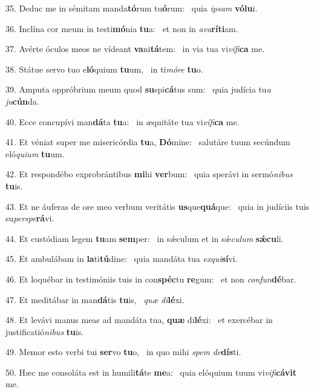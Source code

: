35. Deduc me in sémitam manda\textbf{tó}rum tu\textbf{ó}rum: \ast\  quia \textit{ip}\textit{sam} \textbf{vó}\textbf{lu}i.\

36. Inclína cor meum in testi\textbf{mó}nia \textbf{tu}a: \ast\  et non in \textit{a}\textit{va}\textbf{rí}\textbf{ti}am.\

37. Avérte óculos meos ne vídeant \textbf{va}ni\textbf{tá}tem: \ast\  in via tua vi\textit{ví}\textit{fi}\textbf{ca} me.\

38. Státue servo tuo e\textbf{ló}quium \textbf{tu}um, \ast\  in ti\textit{mó}\textit{re} \textbf{tu}o.\

39. Amputa oppróbrium meum quod \textbf{su}spi\textbf{cá}tus sum: \ast\  quia judícia tu\textit{a} \textit{ju}\textbf{cún}da.\

40. Ecce concupívi man\textbf{dá}ta \textbf{tu}a: \ast\  in æquitáte tua vi\textit{ví}\textit{fi}\textbf{ca} me.\

41. Et véniat super me misericórdia \textbf{tu}a, \textbf{Dó}mine: \ast\  salutáre tuum secúndum eló\textit{qui}\textit{um} \textbf{tu}um.\

42. Et respondébo exprobrántibus \textbf{mi}hi \textbf{ver}bum: \ast\  quia sperávi in sermó\textit{ni}\textit{bus} \textbf{tu}is.\

43. Et ne áuferas de ore meo verbum veritátis \textbf{us}que\textbf{quá}que: \ast\  quia in judíciis tuis su\textit{per}\textit{spe}\textbf{rá}vi.\

44. Et custódiam legem \textbf{tu}am \textbf{sem}per: \ast\  in sǽculum et in sǽ\textit{cu}\textit{lum} \textbf{sǽ}\textbf{cu}li.\

45. Et ambulábam in \textbf{la}ti\textbf{tú}dine: \ast\  quia mandáta tua \textit{ex}\textit{qui}\textbf{sí}vi.\

46. Et loquébar in testimóniis tuis in con\textbf{spéc}tu \textbf{re}gum: \ast\  et non \textit{con}\textit{fun}\textbf{dé}bar.\

47. Et meditábar in man\textbf{dá}tis \textbf{tu}is, \ast\  \textit{quæ} \textit{di}\textbf{lé}xi.\

48. Et levávi manus meas ad mandáta tua, \textbf{quæ} di\textbf{lé}xi: \ast\  et exercébar in justificatió\textit{ni}\textit{bus} \textbf{tu}is.\

49. Memor esto verbi tui \textbf{ser}vo \textbf{tu}o, \ast\  in quo mihi \textit{spem} \textit{de}\textbf{dís}ti.\

50. Hæc me consoláta est in humili\textbf{tá}te \textbf{me}a: \ast\  quia elóquium tuum vi\textit{vi}\textit{fi}\textbf{cá}\textbf{vit} me.\

